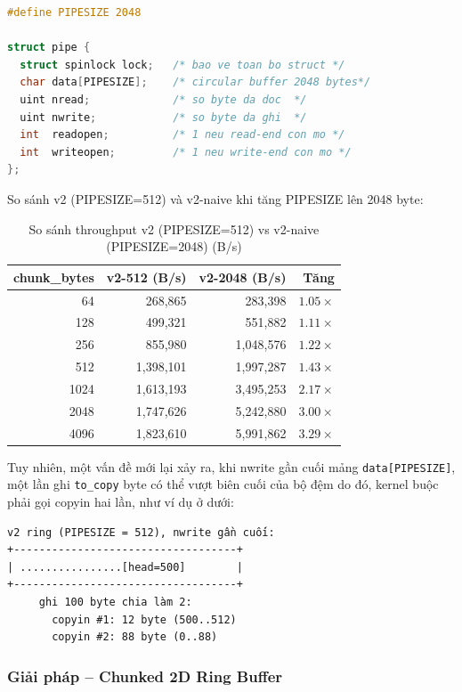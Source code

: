 \documentclass[12pt,a4paper]{article}
\newcommand{\code}[1]{\texttt{#1}}
\begin{document}
\begin{lstlisting}[language=C]
#define PIPESIZE 2048

struct pipe {
  struct spinlock lock;   /* bao ve toan bo struct */
  char data[PIPESIZE];    /* circular buffer 2048 bytes*/
  uint nread;             /* so byte da doc  */
  uint nwrite;            /* so byte da ghi  */
  int  readopen;          /* 1 neu read-end con mo */
  int  writeopen;         /* 1 neu write-end con mo */
};
\end{lstlisting}

So sánh v2 (PIPESIZE=512) và v2-naive khi tăng PIPESIZE lên 2048 byte:
\begin{table}[H]
    \centering
    \caption{So sánh throughput v2 (PIPESIZE=512) vs v2-naive (PIPESIZE=2048) (B/s)}
    \begin{tabular}{rrrr}
    \toprule
    \textbf{chunk\_bytes} & \textbf{v2-512 (B/s)} & \textbf{v2-2048 (B/s)} & \textbf{Tăng} \\
    \midrule
    64   & 268,865   & 283,398   & $1.05\times$ \\
    128  & 499,321   & 551,882   & $1.11\times$ \\
    256  & 855,980   & 1,048,576 & $1.22\times$ \\
    512  & 1,398,101 & 1,997,287 & $1.43\times$ \\
    1024 & 1,613,193 & 3,495,253 & $2.17\times$ \\
    2048 & 1,747,626 & 5,242,880 & $3.00\times$ \\
    4096 & 1,823,610 & 5,991,862 & $3.29\times$ \\
    \bottomrule
    \end{tabular}
\end{table}

Tuy nhiên, một vấn đề mới lại xảy ra, khi nwrite gần cuối mảng \code{data[PIPESIZE]}, một lần ghi \code{to\_copy} byte
có thể vượt biên cuối của bộ đệm do đó, kernel buộc phải gọi copyin hai lần, như ví dụ ở dưới:
\begin{verbatim}
v2 ring (PIPESIZE = 512), nwrite gần cuối:
+-----------------------------------+
| ................[head=500]        |
+-----------------------------------+
     ghi 100 byte chia làm 2:
       copyin #1: 12 byte (500..512)
       copyin #2: 88 byte (0..88)
\end{verbatim}
\subsubsection{Giải pháp -- Chunked 2D Ring Buffer}
\end{document}
